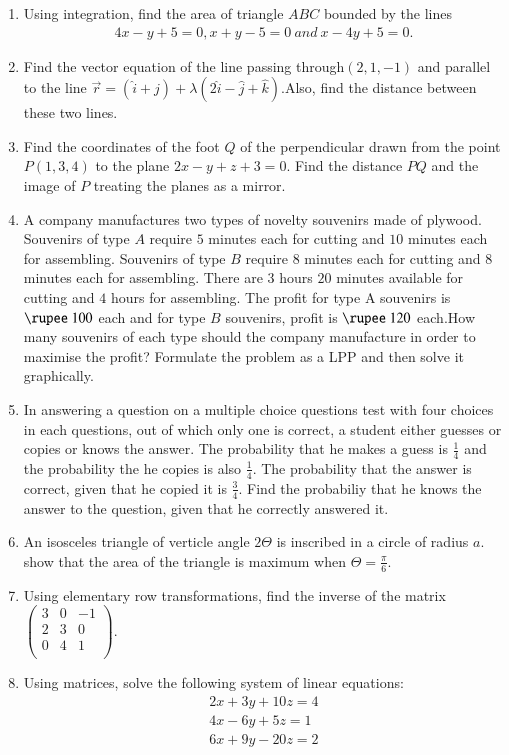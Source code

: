 \documentclass[10pt,-letter paper]{article}
\providecommand{\brak}[1]{\ensuremath{\left(#1\right)}}
\newcommand{\myvec}[1]{\ensuremath{\begin{pmatrix}#1\end{pmatrix}}}
\begin{document}
\begin{enumerate}
\item Using integration, find the area of triangle $ABC$ bounded by the lines 
\begin{align*}4x-y+5=0, x+y-5=0~and~x-4y+5=0.
\end{align*}

\item Find the vector equation of the line passing through$\brak{2,1,-1}$ and parallel to the line $\overrightarrow{r}=\brak{\hat{i}+\hat{j}}+\lambda\brak{2\hat{i}-\hat{j}+\hat{k}}$.Also, find the distance between these two lines.

\item Find the coordinates of the foot $Q$ of the perpendicular drawn from the point $P\brak{1,3,4}$ to the plane $2x-y+z+3=0$. Find the distance $PQ$ and the image of $P$ treating the planes as a mirror.

\item A company manufactures two types of novelty souvenirs made of plywood. Souvenirs of type $A$ require $5$ minutes each for cutting and $10$ minutes each for assembling. Souvenirs of type $B$ require $8$ minutes each for cutting and $8$ minutes each for assembling. There are $3$ hours $20$ minutes available for cutting and $4$ hours for assembling. The profit for type A souvenirs is $\rupee~100$ each and for type $B$ souvenirs, profit is $\rupee~120$ each.How many souvenirs of each type should the company manufacture in order to maximise the profit? Formulate the problem as a LPP and then solve it graphically.

\item In answering a question on a multiple choice questions test with four choices in each questions, out of which only one is correct, a student either guesses or copies or knows the answer. The probability that he makes a guess is $\frac{1}{4}$ and the probability the he copies is also $\frac{1}{4}$. The probability that the answer is correct, given that he copied it is $\frac{3}{4}$. Find the probabiliy that he knows the answer to the question, given that  he correctly answered it.

\item An isosceles triangle of verticle angle $2\Theta$ is inscribed in a circle of radius $a$. show that the area of the triangle is maximum when $\Theta=\frac{\pi}{6}$.

\item Using elementary row transformations, find the inverse of the matrix $\myvec{3 & 0 & -1\\2 & 3 & 0\\0 & 4 & 1\\}$.

\item Using matrices, solve the following system of linear equations:\begin{align*}2x+3y+10z=4\\4x-6y+5z=1\\6x+9y-20z=2\end{align*}

\end{enumerate}
\end{document}
